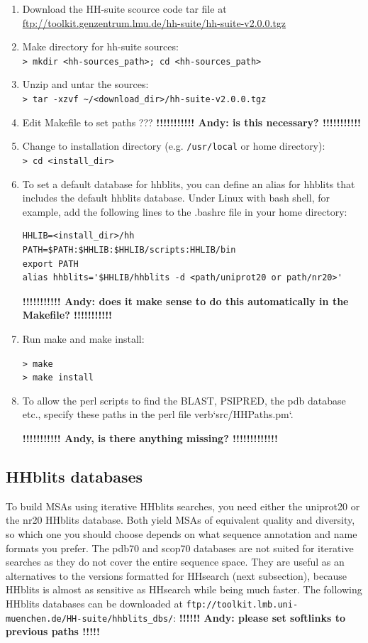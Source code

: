 \documentclass[11pt,a4paper]{article}
\begin{document}
\begin{enumerate}
\item Download the HH-suite scource code tar file at \url{ftp://toolkit.genzentrum.lmu.de/hh-suite/hh-suite-v2.0.0.tgz}
\item Make directory for hh-suite sources:\\
  \verb`> mkdir <hh-sources_path>; cd <hh-sources_path>`
\item Unzip and untar the sources:\\
  \verb`> tar -xzvf ~/<download_dir>/hh-suite-v2.0.0.tgz`
\item Edit Makefile to set paths ???
 {\bf  !!!!!!!!!!! Andy: is this necessary? !!!!!!!!!!!}

\item Change to installation directory (e.g. \verb`/usr/local` or home directory):\\
  \verb`> cd <install_dir>`

\item To set a default database for hhblits, you can define an alias for hhblits that includes the default hhblits database. Under Linux with bash shell, for example, add the following lines to the .bashrc file in your home directory:
\begin{verbatim}
HHLIB=<install_dir>/hh
PATH=$PATH:$HHLIB:$HHLIB/scripts:HHLIB/bin
export PATH
alias hhblits='$HHLIB/hhblits -d <path/uniprot20 or path/nr20>'
\end{verbatim}
{\bf !!!!!!!!!!! Andy: does it make sense to do this automatically in the Makefile? !!!!!!!!!!! }

\item Run make and make install:
  
  \verb`> make`\\
  \verb`> make install`

\item To allow the perl scripts to find the BLAST, PSIPRED, the pdb database etc., specify these paths in the perl file verb`src/HHPaths.pm`.

{\bf !!!!!!!!!!! Andy, is there anything missing? !!!!!!!!!!!!! }
\end{enumerate}

\subsection{HHblits databases} \label{hhblits_dbs}
To build MSAs using iterative HHblits searches, you need either the uniprot20 or the nr20 HHblits database. Both yield MSAs of equivalent quality and diversity, so which one you should choose depends on what sequence annotation and name formats you prefer. The pdb70 and scop70 databases are not suited for iterative searches as they do not cover the entire sequence space. They are useful as an alternatives to the versions formatted for HHsearch (next subsection), because HHblits is almost as sensitive as HHsearch while being much faster. The following HHblits databases can be downloaded at 
\verb`ftp://toolkit.lmb.uni-muenchen.de/HH-suite/hhblits_dbs/`: 
{\bf  !!!!!! Andy: please set softlinks to previous paths !!!!! }
\end{document}
